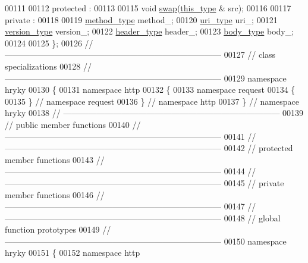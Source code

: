 \begin{DoxyCode}
00111 
00112 \textcolor{keyword}{protected} :
00113 
00115     \textcolor{keywordtype}{void} \hyperlink{classhryky_1_1http_1_1request_1_1_entity_af2a9b5f2c8163d683423172ab14d762c}{swap}(\hyperlink{classhryky_1_1http_1_1request_1_1_entity_ab4ff6edca126070d13656b4fd74942ec}{this_type} & src);
00116 
00117 \textcolor{keyword}{private} :
00118 
00119     \hyperlink{classhryky_1_1http_1_1method_1_1_entity}{method_type}     method\_;
00120     \hyperlink{classhryky_1_1uri_1_1_entity}{uri_type}        uri\_;
00121     \hyperlink{classhryky_1_1http_1_1version_1_1_entity}{version_type}    version\_;
00122     \hyperlink{classhryky_1_1http_1_1header_1_1_entity}{header_type}     header\_;
00123     \hyperlink{classhryky_1_1http_1_1body_1_1_entity}{body_type}       body\_;
00124 
00125 \};
00126 \textcolor{comment}{//
      ------------------------------------------------------------------------------}
00127 \textcolor{comment}{// class specializations}
00128 \textcolor{comment}{//
      ------------------------------------------------------------------------------}
00129 \textcolor{keyword}{namespace }hryky
00130 \{
00131 \textcolor{keyword}{namespace }http
00132 \{
00133 \textcolor{keyword}{namespace }request
00134 \{
00135 \} \textcolor{comment}{// namespace request}
00136 \} \textcolor{comment}{// namespace http}
00137 \} \textcolor{comment}{// namespace hryky}
00138 \textcolor{comment}{//
      ------------------------------------------------------------------------------}
00139 \textcolor{comment}{// public member functions}
00140 \textcolor{comment}{//
      ------------------------------------------------------------------------------}
00141 \textcolor{comment}{//
      ------------------------------------------------------------------------------}
00142 \textcolor{comment}{// protected member functions}
00143 \textcolor{comment}{//
      ------------------------------------------------------------------------------}
00144 \textcolor{comment}{//
      ------------------------------------------------------------------------------}
00145 \textcolor{comment}{// private member functions}
00146 \textcolor{comment}{//
      ------------------------------------------------------------------------------}
00147 \textcolor{comment}{//
      ------------------------------------------------------------------------------}
00148 \textcolor{comment}{// global function prototypes}
00149 \textcolor{comment}{//
      ------------------------------------------------------------------------------}
00150 \textcolor{keyword}{namespace }hryky
00151 \{
00152 \textcolor{keyword}{namespace }http

\end{DoxyCode}
